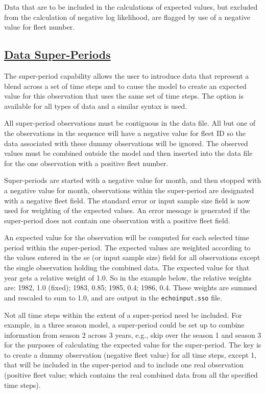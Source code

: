 Data that are to be included in the calculations of expected values, but excluded from the calculation of negative log likelihood, are flagged by use of a negative value for fleet number.

\hypertarget{SuperPeriod}{}
\subsection[Data Super-Periods]{\protect\hyperlink{SuperPeriod}{Data Super-Periods}}
The super-period capability allows the user to introduce data that represent a blend across a set of time steps and to cause the model to create an expected value for this observation that uses the same set of time steps. The option is available for all types of data and a similar syntax is used. 

All super-period observations must be contiguous in the data file. All but one of the observations in the sequence will have a negative value for fleet ID so the data associated with these dummy observations will be ignored. The observed values must be combined outside the model and then inserted into the data file for the one observation with a positive fleet number.

Super-periods are started with a negative value for month, and then stopped with a negative value for month, observations within the super-period are designated with a negative fleet field. The standard error or input sample size field is now used for weighting of the expected values. An error message is generated if the super-period does not contain one observation with a positive fleet field.

An expected value for the observation will be computed for each selected time period within the super-period. The expected values are weighted according to the values entered in the \gls{se} (or input sample size) field for all observations except the single observation holding the combined data. The expected value for that year gets a relative weight of 1.0. So in the example below, the relative weights are: 1982, 1.0 (fixed); 1983, 0.85; 1985, 0.4; 1986, 0.4. These weights are summed and rescaled to sum to 1.0, and are output in the \texttt{echoinput.sso} file.

Not all time steps within the extent of a super-period need be included. For example, in a three season model, a super-period could be set up to combine information from season 2 across 3 years, e.g., skip over the season 1 and season 3 for the purposes of calculating the expected value for the super-period. The key is to create a dummy observation (negative fleet value) for all time steps, except 1, that will be included in the super-period and to include one real observation (positive fleet value; which contains the real combined data from all the specified time steps).

